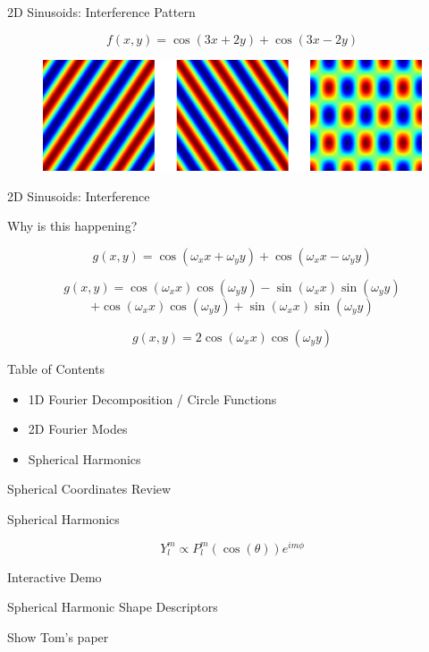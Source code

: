 \documentclass{beamer}
\begin{document}
\begin{frame}{2D Sinusoids: Interference Pattern}

\[ f(x, y) = \cos(3x + 2y) + \cos(3x - 2y) \]

\begin{figure}[t]
    \includegraphics[width=\textwidth]{2DInterference/Interference_32.png}
\end{figure}


\end{frame}


\begin{frame}{2D Sinusoids: Interference}

Why is this happening?

\[ g(x, y) = \cos(\omega_x x + \omega_y y) + \cos(\omega_x x - \omega_y y) \]

 {
    \[ g(x, y) = \cos(\omega_x x)\cos(\omega_y y) - \sin(\omega_x x)\sin(\omega_y y) \] 
    \[+ \cos(\omega_x x)\cos(\omega_y y) + \sin(\omega_x x)\sin(\omega_y y) \]
}

 {
    \[ g(x, y) = 2 \cos(\omega_x x)\cos(\omega_y y) \]
}

\end{frame}


\begin{frame}{Table of Contents}
\begin{itemize}[label=$\vartriangleright$]
	\item 1D Fourier Decomposition / Circle Functions
\end{itemize}
\begin{itemize}[label=$\vartriangleright$]
	\item 2D Fourier Modes
\end{itemize}
\begin{itemize}[label=$\blacktriangleright$]
	\item Spherical Harmonics
\end{itemize}
\end{frame}


\begin{frame}{Spherical Coordinates Review}


\end{frame}


\begin{frame}{Spherical Harmonics}


\[ Y^m_l \propto P_{l}^m(\cos(\theta)) e^{i m \phi} \]

Interactive Demo

\end{frame}


\begin{frame}{Spherical Harmonic Shape Descriptors}


Show Tom's paper

\end{frame}
\end{document}
